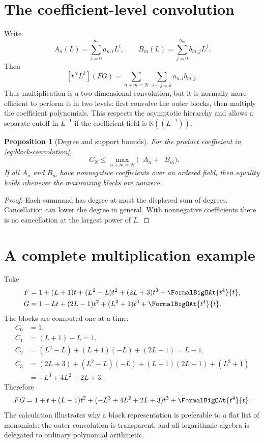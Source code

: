 \documentclass[11pt,oneside]{book}
\newtheorem{proposition}[theorem]{Proposition}
\theoremstyle{definition}
\theoremstyle{remark}
\DeclareMathOperator{\degL}{deg_{\!L}}
\newcommand{\K}{\mathbb K}
\begin{document}
\section{The coefficient-level convolution}
Write
\[
 A_n(L)=\sum_{i=0}^{a_n}a_{n,i}L^i,
 \qquad
 B_m(L)=\sum_{j=0}^{b_m}b_{m,j}L^j.
\]
Then
\begin{equation}\label{eq:two-dimensional-convolution}
 [t^NL^k](FG)
 =\sum_{n+m=N}\ \sum_{i+j=k}a_{n,i}b_{m,j}.
\end{equation}
Thus multiplication is a two-dimensional convolution, but it is normally
more efficient to perform it in two levels: first convolve the outer blocks,
then multiply the coefficient polynomials.  This respects the asymptotic
hierarchy and allows a separate cutoff in $L^{-1}$ if the coefficient field is
$\K((L^{-1}))$.

\begin{proposition}[Degree and support bounds]\label{prop:degree-bounds}
For the product coefficient in \eqref{eq:block-convolution},
\[
 \degL C_N\le
 \max_{n+m=N}\bigl(\degL A_n+\degL B_m\bigr).
\]
If all $A_n$ and $B_m$ have nonnegative coefficients over an ordered field,
then equality holds whenever the maximizing blocks are nonzero.
\end{proposition}
\begin{proof}
Each summand has degree at most the displayed sum of degrees.  Cancellation
can lower the degree in general.  With nonnegative coefficients there is no
cancellation at the largest power of $L$.
\end{proof}

\section{A complete multiplication example}
Take
\begin{align*}
 F&=1+(L+1)t+(L^2-L)t^2+(2L+3)t^3+\FormalBigOAt{t^4}{t},\\
 G&=1-Lt+(2L-1)t^2+(L^2+1)t^3+\FormalBigOAt{t^4}{t}.
\end{align*}
The blocks are computed one at a time:
\begin{align*}
 C_0&=1,\\
 C_1&=(L+1)-L=1,\\
 C_2&=(L^2-L)+(L+1)(-L)+(2L-1)
      =L-1,\\
 C_3&=(2L+3)+(L^2-L)(-L)+(L+1)(2L-1)+(L^2+1)\\
    &=-L^3+4L^2+2L+3.
\end{align*}
Therefore
\begin{equation}\label{eq:product-example}
 FG=1+t+(L-1)t^2+(-L^3+4L^2+2L+3)t^3+\FormalBigOAt{t^4}{t}.
\end{equation}
The calculation illustrates why a block representation is preferable to a
flat list of monomials: the outer convolution is transparent, and all
logarithmic algebra is delegated to ordinary polynomial arithmetic.
\end{document}
